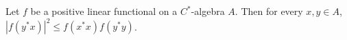Let $f$ be a positive linear functional on a $C^*$-algebra $A$. Then for every $x, y \in A$, $|f(y^*x)|^2 \leqslant f(x^*x)f(y^*y)$.

